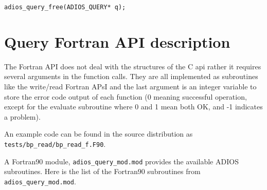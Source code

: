 \begin{lstlisting}[alsolanguage=C]
adios_query_free(ADIOS_QUERY* q);
\end{lstlisting}

%
%
\section{Query Fortran API description}
\label{section:query_fortran_api}

The Fortran API does not deal with the structures of the C api rather it requires 
several arguments in the function calls.  They are all implemented as subroutines 
like the write/read Fortran APsI and the last argument is an integer variable to store 
the error code output of each function (0 meaning successful operation,  except 
for the evaluate subroutine where 0 and 1 mean both OK, and -1 indicates a problem).

{\color{red}An example code can be found in the source distribution as 
\verb+tests/bp_read/bp_read_f.F90+.}

A Fortran90 module, \verb+adios_query_mod.mod+ provides the available ADIOS subroutines. 
Here is the list of the Fortran90 subroutines from \verb+adios_query_mod.mod+. 

